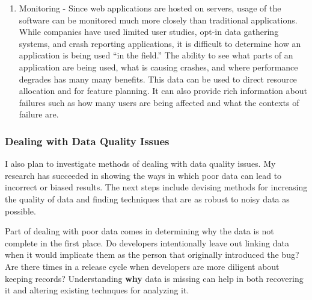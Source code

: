 \documentclass[10pt]{article}
\newcommand\Subsection[1]{\subsubsection*{\small #1}}
\begin{document}
\begin{small}
\begin{enumerate}
\item Monitoring - Since web applications are hosted on servers, usage of the software
    can be monitored much more closely than traditional applications.  While companies have used limited
    user studies, opt-in data gathering systems, and crash reporting applications, it is difficult
    to determine how an application is being used ``in the field.'' 
    The ability to see what parts of an application are being used, what is causing crashes, and where
    performance degrades has many many benefits.  This data can be used to direct resource allocation and for
    feature planning.  It can also provide rich information about failures such as how many users 
    are being affected and what the contexts of failure are.  

\end{enumerate}


\Subsection{Dealing with Data Quality Issues}

I also plan to investigate methods of dealing with data quality issues.  My
research has succeeded in showing the ways in which poor data can lead to
incorrect or biased results.  The next steps include devising methods for
increasing the quality of data and finding techniques that are as robust to
noisy data as possible.

Part of dealing with poor data comes in determining why the data is not complete
in the first place.  Do developers intentionally leave out linking data when it would
implicate them as the person that originally introduced the bug?  Are there times
in a release cycle when developers are more diligent about keeping records?  Understanding
\textbf{why} data is missing can help in both recovering it and altering existing technques
for analyzing it.

\vspace{0.5cm}

\end{small}

\begin{footnotesize}

%
%

\end{footnotesize}
\end{document}

